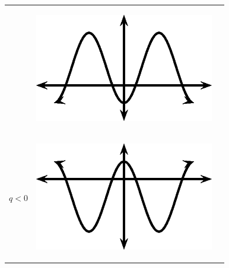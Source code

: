 \begin{center}
\begin{xtabular*}{\mytablewidth}[t]{|p{10\mystarwidth}|p{10\mystarwidth}|p{10\mystarwidth}|}
\begin{center}
\vspace{2pt}
\vspace{.1in}
\end{center}    
    &
\setcounter{subfigure}{0}
\label{m39414*id88196}
\begin{center}
\label{m39414*id88196!!!underscore!!!media}\label{m39414*id88196!!!underscore!!!printimage}\includegraphics{col11306.imgs/m39414_MG10C15_027.png} %
\vspace{2pt}
\vspace{.1in}
\end{center}    
\tabularnewline{}
    $q<0$
    &
\setcounter{subfigure}{0}
\label{m39414*id88234}
\begin{center}
\label{m39414*id88234!!!underscore!!!media}\label{m39414*id88234!!!underscore!!!printimage}\includegraphics{col11306.imgs/m39414_MG10C15_028.png} %
\vspace{2pt}
\vspace{.1in}

\end{center}
\end{xtabular*}
\end{center}
